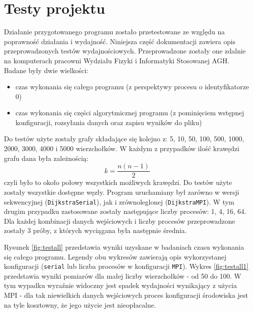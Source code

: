 \documentclass[12pt]{article}
\begin{document}
\section{Testy projektu}
Działanie przygotowanego programu zostało przetestowane ze względu na poprawność działania i wydajność. Niniejsza część dokumentacji zawiera opis przeprowadzonych testów wydajnościowych. Przeprowadzone zostały one zdalnie na komputerach pracowni Wydziału Fizyki i Informatyki Stosowanej AGH. Badane były dwie wielkości:
\begin{itemize}
\item czas wykonania się całego programu (z perspektywy procesu o identyfikatorze 0)
\item czas wykonania się części algorytmicznej programu (z pominięciem wstępnej konfiguracji, rozsyłania danych oraz zapisu wyników do pliku)
\end{itemize}
Do testów użyte zostały grafy składające się kolejno z: 5, 10, 50, 100, 500, 1000, 2000, 3000, 4000 i 5000 wierzchołków. W każdym z przypadków ilość krawędzi grafu dana była zależnością:
\begin{equation}
k = \frac{n(n-1)}{2}
\end{equation}
czyli było to około połowy wszystkich możliwych krawędzi. Do testów użyte zostały wszystkie dostępne węzły. Program uruchamiany był zarówno w wersji sekwencyjnej (\lstinline{DijkstraSerial}), jak i zrównoleglonej (\lstinline{DijkstraMPI}). W tym drugim przypadku zastosowane zostały następujące liczby procesów: 1, 4, 16, 64. Dla każdej kombinacji danych wejściowych i liczby procesów przeprowadzone zostały 3 próby, z których wyciągana była następnie średnia.

\vspace{5mm}
Rysunek \ref{fig:testall} przedstawia wyniki uzyskane w badaniach czasu wykonania się całego programu. Legendy obu wykresów zawierają opis wykorzystanej konfiguracji (\lstinline{serial} lub liczba procesów w konfiguracji \lstinline{MPI}). Wykres \ref{fig:testall1} przedstawia wyniki pomiarów dla małej liczby wierzchołków - od 50 do 100. W tym wypadku wyraźnie widoczny jest spadek wydajności wynikający z użycia MPI - dla tak niewielkich danych wejściowych proces konfiguracji środowiska jest na tyle kosztowny, że jego użycie jest nieopłacalne. 
\end{document}
